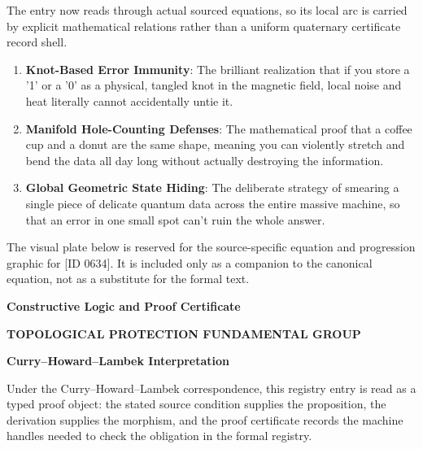 The entry now reads through actual sourced equations, so its local arc is carried by explicit mathematical relations rather than a uniform quaternary certificate record shell.
\endgroup

\begin{enumerate}[leftmargin=1.6em,itemsep=6pt,topsep=4pt]
\item \textbf{Knot-Based Error Immunity}: The brilliant realization that if you store a '1' or a '0' as a physical, tangled knot in the magnetic field, local noise and heat literally cannot accidentally untie it.
\item \textbf{Manifold Hole-Counting Defenses}: The mathematical proof that a coffee cup and a donut are the same shape, meaning you can violently stretch and bend the data all day long without actually destroying the information.
\item \textbf{Global Geometric State Hiding}: The deliberate strategy of smearing a single piece of delicate quantum data across the entire massive machine, so that an error in one small spot can't ruin the whole answer.
\end{enumerate}

\begingroup\footnotesize\sloppy
The visual plate below is reserved for the source-specific equation and progression graphic for [ID 0634]. It is included only as a companion to the canonical equation, not as a substitute for the formal text.
\par\endgroup
\ifTZPDarkEdition
{}
\fi

\clearpage
\begingroup\tzpsupportsetup
\noindent\textbf{\fontsize{10.8pt}{12.8pt}\selectfont [ID 0634] Constructive Logic and Proof Certificate}\par
\noindent\textbf{\fontsize{10pt}{12pt}\selectfont TOPOLOGICAL PROTECTION FUNDAMENTAL GROUP}\par
\vspace{0.45em}
\begingroup
\footnotesize
\setlength{\parskip}{0.22em}
\setlength{\parindent}{0pt}
\noindent\textbf{Curry--Howard--Lambek Interpretation}\par
Under the Curry--Howard--Lambek correspondence, this registry entry is read as a typed proof
object: the stated source condition supplies the proposition, the derivation supplies the
morphism, and the proof certificate records the machine handles needed to check the obligation
in the formal registry.

